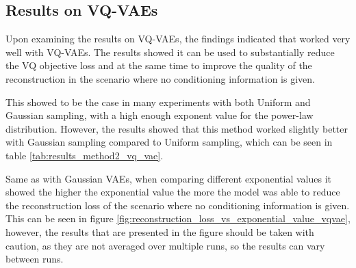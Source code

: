 \subsection{Results on VQ-VAEs}

Upon examining the results on VQ-VAEs, the findings indicated that  worked very well with VQ-VAEs. The results showed it can be used to substantially reduce the VQ objective loss and at the same time to improve the quality of the reconstruction in the scenario where no conditioning information is given. 

This showed to be the case in many experiments with both Uniform and Gaussian sampling, with a high enough exponent value for the power-law distribution. However, the results showed that this method worked slightly better with Gaussian sampling compared to Uniform sampling, which can be seen in table \ref{tab:results_method2_vq_vae}.

Same as with Gaussian VAEs, when comparing different exponential values it showed the higher the exponential value the more the model was able to reduce the reconstruction loss of the scenario where no conditioning information is given. This can be seen in figure \ref{fig:reconstruction_loss_vs_exponential_value_vqvae}, however, the results that are presented in the figure should be taken with caution, as they are not averaged over multiple runs, so the results can vary between runs.




